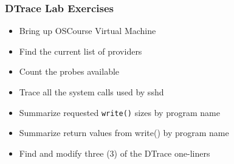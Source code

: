 \documentclass[pdftex,handout]{beamer}
\begin{document}
\begin{frame}[fragile]
  \frametitle{DTrace Lab Exercises}
  \begin{itemize}
  \item Bring up OSCourse Virtual Machine
  \item Find the current list of providers
  \item Count the probes available
  \item Trace all the system calls used by sshd
  \item Summarize requested \verb|write()| sizes by program name
  \item Summarize return values from write() by program name
  \item Find and modify three (3) of the DTrace one-liners
  \end{itemize}
\end{frame}
\end{document}
